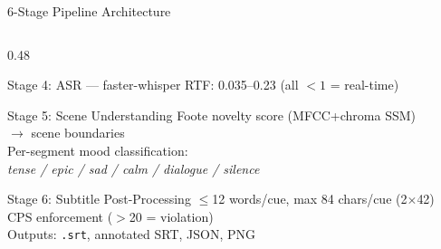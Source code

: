 \documentclass[aspectratio=169]{beamer}
\begin{document}
\begin{frame}{6-Stage Pipeline Architecture}
\begin{columns}[T]
\begin{column}{0.48\textwidth}
\begin{block}{Stage 4: ASR — faster-whisper}
        RTF: 0.035–0.23 (all $< 1$ = real-time)
      \end{block}
      \begin{block}{Stage 5: Scene Understanding}
        Foote novelty score (MFCC+chroma SSM)\\
        $\to$ scene boundaries\\
        Per-segment mood classification:\\
        \textit{tense / epic / sad / calm / dialogue / silence}
      \end{block}
      \begin{block}{Stage 6: Subtitle Post-Processing}
        $\leq$12 words/cue, max 84 chars/cue (2$\times$42)\\
        CPS enforcement ($>$20 = violation)\\
        Outputs: \texttt{.srt}, annotated SRT, JSON, PNG
      \end{block}
    \end{column}
  \end{columns}
\end{frame}
\end{document}
